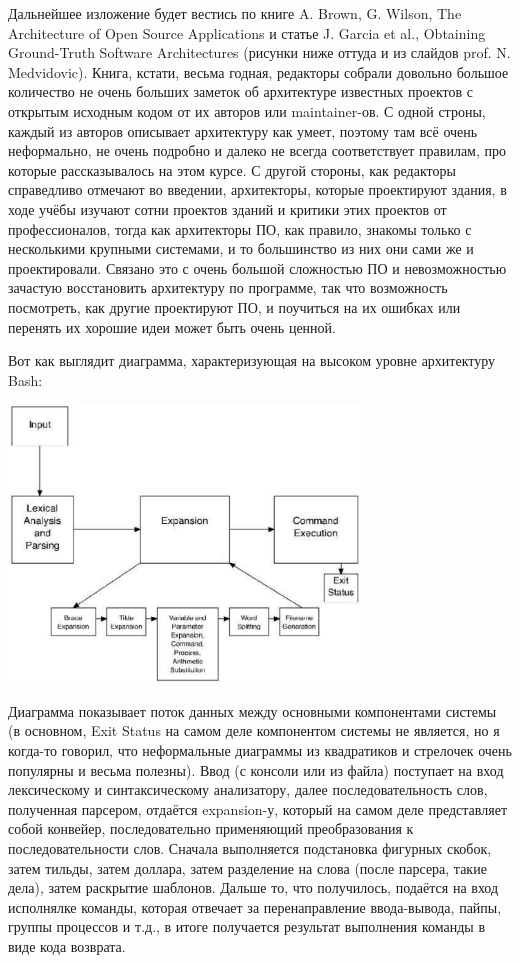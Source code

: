\documentclass[a5paper]{article}
\begin{document}
Дальнейшее изложение будет вестись по книге A. Brown, G. Wilson, The Architecture of Open Source Applications и статье J. Garcia et al., Obtaining Ground-Truth Software Architectures (рисунки ниже оттуда и из слайдов prof. N. Medvidovic). Книга, кстати, весьма годная, редакторы собрали довольно большое количество не очень больших заметок об архитектуре известных проектов с открытым исходным кодом от их авторов или maintainer-ов. С одной строны, каждый из авторов описывает архитектуру как умеет, поэтому там всё очень неформально, не очень подробно и далеко не всегда соответствует правилам, про которые рассказывалось на этом курсе. С другой стороны, как редакторы справедливо отмечают во введении, архитекторы, которые проектируют здания, в ходе учёбы изучают сотни проектов зданий и критики этих проектов от профессионалов, тогда как архитекторы ПО, как правило, знакомы только с несколькими крупными системами, и то большинство из них они сами же и проектировали. Связано это с очень большой сложностью ПО и невозможностью зачастую восстановить архитектуру по программе, так что возможность посмотреть, как другие проектируют ПО, и поучиться на их ошибках или перенять их хорошие идеи может быть очень ценной.

Вот как выглядит диаграмма, характеризующая на высоком уровне архитектуру Bash:

\begin{center}
    \includegraphics[width=0.7\textwidth]{bashArchitecture.png}
\end{center}

Диаграмма показывает поток данных между основными компонентами системы (в основном, Exit Status на самом деле компонентом системы не является, но я когда-то говорил, что неформальные диаграммы из квадратиков и стрелочек очень популярны и весьма полезны). Ввод (с консоли или из файла) поступает на вход лексическому и синтаксическому анализатору, далее последовательность слов, полученная парсером, отдаётся expansion-у, который на самом деле представляет собой конвейер, последовательно применяющий преобразования к последовательности слов. Сначала выполняется подстановка фигурных скобок, затем тильды, затем доллара, затем разделение на слова (после парсера, такие дела), затем раскрытие шаблонов. Дальше то, что получилось, подаётся на вход исполнялке команды, которая отвечает за перенаправление ввода-вывода, пайпы, группы процессов и т.д., в итоге получается результат выполнения команды в виде кода возврата.
\end{document}
